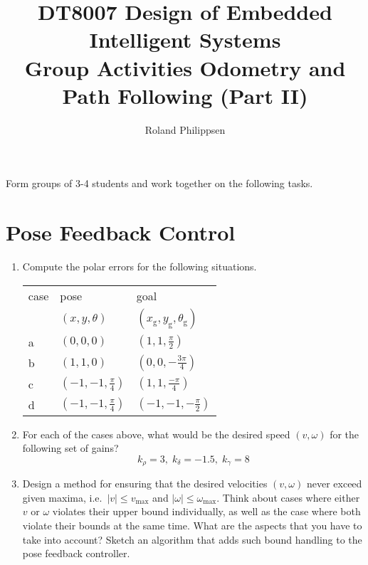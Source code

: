 \documentclass[a4paper]{article}
\begin{document}
\title{
  \large
  DT8007 Design of Embedded Intelligent Systems\\
  \Large
  Group Activities Odometry and Path Following (Part II)}
\author{Roland Philippsen}
\maketitle

\noindent
Form groups of 3-4 students and work together on the following tasks.

\section*{Pose Feedback Control}

\begin{enumerate}

\item
  Compute the polar errors for the following situations.
  
  \begin{center}
    \begin{tabular}{lll}
      \toprule
      case & pose           & goal                                      \\
           & $(x,y,\theta)$ & $(x_\text{g},y_\text{g},\theta_\text{g})$ \\
      \midrule
      a & $( 0,  0, 0)            $ & $( 1,  1,  \frac{ \pi}{2})$ \\
      b & $( 1,  1, 0)            $ & $( 0,  0, -\frac{3\pi}{4})$ \\
      c & $(-1, -1, \frac{\pi}{4})$ & $( 1,  1,  \frac{-\pi}{4})$ \\
      d & $(-1, -1, \frac{\pi}{4})$ & $(-1, -1, -\frac{ \pi}{2})$ \\
      \bottomrule
    \end{tabular}
  \end{center}
  
\item
  For each of the cases above, what would be the desired speed $(v,\omega)$ for the following set of gains?
  \[
  k_\rho = 3,\; k_\delta = -1.5,\; k_\gamma = 8
  \]
  
\item
  Design a method for ensuring that the desired velocities $(v,\omega)$ never exceed given maxima, i.e.\ $|v|\leq v_\text{max}$ and $|\omega|\leq \omega_\text{max}$.
  Think about cases where either $v$ or $\omega$ violates their upper bound individually, as well as the case where both violate their bounds at the same time.
  What are the aspects that you have to take into account?
  Sketch an algorithm that adds such bound handling to the pose feedback controller.
  
\end{enumerate}
\end{document}
